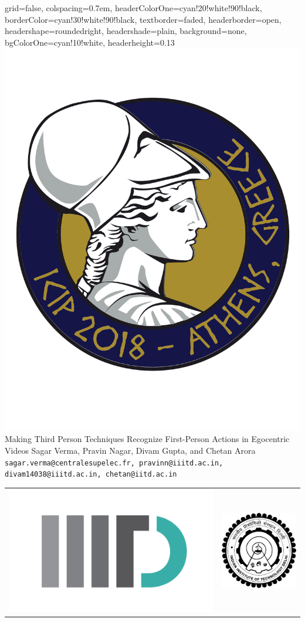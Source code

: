 \documentclass[landscape,a0paper,fontscale=0.292]{baposter}
\begin{document}
\begin{poster}{
 grid=false,
 colspacing=0.7em,
 headerColorOne=cyan!20!white!90!black,
 borderColor=cyan!30!white!90!black,
 textborder=faded,
 headerborder=open,
 headershape=roundedright,
 headershade=plain,
 background=none,
 bgColorOne=cyan!10!white,
 headerheight=0.13\textheight}
 {
      \includegraphics[width=0.08 \linewidth]{logo_icip}
 }
 {\sc\Huge Making Third Person Techniques Recognize First-Person Actions in Egocentric Videos}
  {Sagar Verma, Pravin Nagar, Divam Gupta, and Chetan Arora\\[1em]
  {\texttt{sagar.verma@centralesupelec.fr, pravinn@iiitd.ac.in, divam14038@iiitd.ac.in, chetan@iitd.ac.in}}}
  {
   \begin{tabular}{r r}
     \includegraphics[height=0.08\textheight]{logo_iiitd} &
     \includegraphics[height=0.08\textheight]{logo_iitd} \\
   \end{tabular}
  }


\end{poster}
\end{document}
